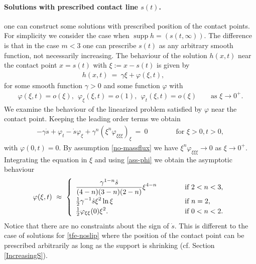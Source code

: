 \documentclass[pagesize,pdftex]{amsart}
\newcommand{\DS}{\displaystyle}
\newcommand{\gam}{\gamma}
\renewcommand{\phi}{\varphi}
\DeclareMathOperator*{\spt}{supp}
\begin{document}
\paragraph{Solutions with prescribed contact line $s(t)$.} one can construct some solutions with prescribed position of the contact
points. For simplicity we consider the case when $\spt h = (s(t,\infty))$. The
difference is that in the case $m<3$ one can prescribe $s(t)$ as any arbitrary
smooth function, not necessarily increasing. The behaviour of the solution
$h(x,t)$ near the contact point $x=s(t)$ with $\xi := x - s(t)$ is given by
\begin{align}
  h(x,t) \ = \ \gam \xi  + \phi (\xi,t), \qquad %
\end{align}%
for some smooth function $\gam >0$ and some function $\phi$ with
\begin{align} \label{ass-phi} %
  \phi(\xi,t) = o(\xi ), \ \  %
  \phi_\xi(\xi,t) = o(1), \ \  %
  \phi_t(\xi,t) = o(\xi) \qquad %
  \text{as $\xi\to 0^+$}. 
\end{align}
We examine the behaviour of the linearized problem satisfied by $\phi $ near
the contact point. Keeping the leading order terms we obtain%
\begin{align}
  -\gam \dot s  + \phi_t -\dot s  \phi_\xi + \gam^n (\xi^n \phi_{\xi\xi\xi})_\xi  \ %
  =  \ 0 \qquad\qquad %
  \text{for $\xi >0, t>0$},
\end{align}%
with  $\phi (0,t) =0$. By assumption \eqref{no-massflux} we
have $\xi^n \phi_{\xi\xi \xi}\to 0$ as $\xi\to 0^+$. Integrating the equation in
$\xi$ and using \eqref{ass-phi} we obtain the asymptotic behaviour
\begin{align}   \label{S5E6} %
  \phi(\xi,t) \ \approx \
  \left \{
  \begin{array}{ll}
      \DS \frac{\gam^{1-n}\dot s }{(4-n)(3-n)(2-n) }\xi^{4-n}\ \ \ \qquad %
    &\text{if $2 < n < 3$,} \vspace{0.5ex}\\
    \DS \tfrac 12 \gam^{-1}\dot s  \xi^2 \ln \xi\ \ \ \qquad %
    &\text{if $n = 2$,} \vspace{0.5ex} \\
    \DS \tfrac 12 \phi_{\xi\xi}(0) \xi^2.
    &\text{if $0 < n < 2$}.
  \end{array}
  \right.
\end{align}%
Notice that there are no constraints about the sign of $\dot s$. This is
different to the case of solutions for \eqref{tfe-noslip} where the position of
the contact point can be prescribed arbitrarily as long as the support is
shrinking (cf.  Section \ref{IncreasingS}).
\end{document}
